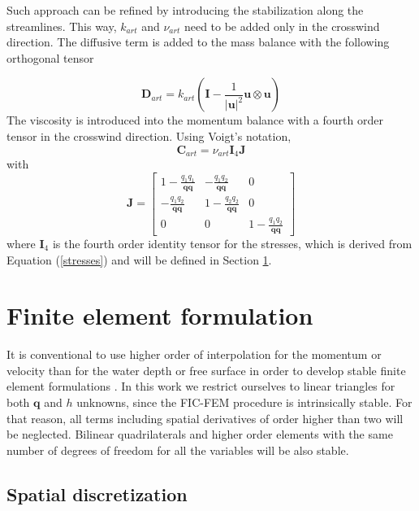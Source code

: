\documentclass[a4paper,12pt]{article}
\newcommand{\abs}[1]{\lvert#1\rvert}
\begin{document}
Such approach can be refined by introducing the stabilization along the streamlines. This way, $k_{art}$ and $\nu_{art}$ need to be added only in the crosswind direction. The diffusive term is added to the mass balance with the following orthogonal tensor

\begin{equation}
\mathbf{D}_{art} = k_{art}
\left( \mathbf{I} - \frac{1}{\abs{\mathbf{u}}^2} \mathbf{u} \otimes \mathbf{u} \right)
\end{equation}
The viscosity is introduced into the momentum balance with a fourth order tensor in the crosswind direction. Using Voigt's notation,
\begin{equation}
\mathbf{C}_{art} = \nu_{art} \mathbf{I}_4 \mathbf{J}
\end{equation}
with
\begin{equation}
\mathbf{J} = \left[\begin{matrix}
    1-\frac{q_1q_1}{\mathbf{q}\mathbf{q}} & -\frac{q_1q_2}{\mathbf{q}\mathbf{q}} & 0 \\
    -\frac{q_1q_2}{\mathbf{q}\mathbf{q}} & 1-\frac{q_2q_2}{\mathbf{q}\mathbf{q}} & 0 \\
    0 & 0 & 1-\frac{q_1q_2}{\mathbf{q}\mathbf{q}}
\end{matrix}\right]
\end{equation}
where $\mathbf{I}_4$ is the fourth order identity tensor for the stresses, which is derived from Equation (\ref{stresses}) and will be defined in Section \ref{sec:fem}.

\section{Finite element formulation} \label{sec:fem} 

It is conventional to use higher order of interpolation for the momentum or velocity than for the water depth or free surface in order to develop stable finite element formulations \cite{hood1974,heniche2000,bercovier1979}. In this work we restrict ourselves to linear triangles for both $\mathbf{q}$ and $h$ unknowns, since the FIC-FEM procedure is intrinsically stable. For that reason, all terms including spatial derivatives of order higher than two will be neglected. Bilinear quadrilaterals and higher order elements with the same number of degrees of freedom for all the variables will be also stable.

\subsection{Spatial discretization}
\end{document}
